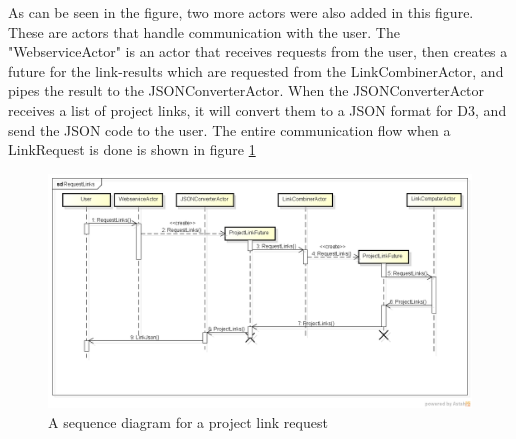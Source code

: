 \documentclass[10pt,a4paper]{article}
\begin{document}
As can be seen in the figure, two more actors were also added in this figure. These are actors that handle communication with the user. The "WebserviceActor" is an actor that receives requests from the user, then creates a future for the link-results which are requested from the LinkCombinerActor, and pipes the result to the JSONConverterActor. When the JSONConverterActor receives a list of project links, it will convert them to a JSON format for D3, and send the JSON code to the user. The entire communication flow when a LinkRequest is done is shown in figure \ref{fig:actor_seq}




\begin{figure}[htb]
    \centering
    \includegraphics[width=1.0\textwidth]{RequestLinks}
    \caption{A sequence diagram for a project link request}
    \label{fig:actor_seq}
\end{figure}
\end{document}
